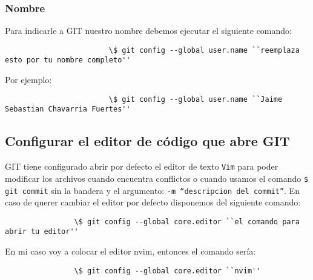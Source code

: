             \subsubsection{Nombre}
                Para indicarle a GIT nuestro nombre debemos ejecutar el siguiente comando:
                    \begin{lstlisting}
                        \$ git config --global user.name ``reemplaza esto por tu nombre completo''
                    \end{lstlisting}
                Por ejemplo:
                    \begin{lstlisting}
                        \$ git config --global user.name ``Jaime Sebastian Chavarria Fuertes''
                    \end{lstlisting}

    \subsection{Configurar el editor de c\'odigo que abre GIT}
        GIT tiene configurado abrir por defecto el editor de texto \texttt{Vim} para poder modificar los archivos cuando encuentra conflictos o cuando usamos el comando \texttt{\$ git commit} sin la bandera y el argumento: \texttt{-m ``descripcion del commit''}.
        En caso de querer cambiar el editor por defecto disponemos del siguiente comando:
            \begin{lstlisting}
                \$ git config --global core.editor ``el comando para abrir tu editor''
            \end{lstlisting}
        En mi caso voy a colocar el editor nvim, entonces el comando ser\'ia:
            \begin{lstlisting}
                \$ git config --global core.editor ``nvim''
            \end{lstlisting}
    
